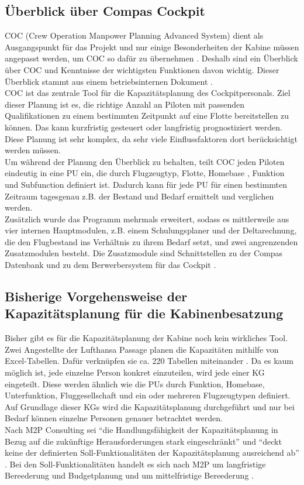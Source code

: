 \documentclass [12pt, a4paper, oneside, titlepage, ngerman]{article}
\begin{document}
\subsection{Überblick über Compas Cockpit}
\ac{COC} (Crew Operation Manpower Planning Advanced System) dient als Ausgangspunkt für das Projekt und nur einige Besonderheiten der Kabine müssen angepasst werden, um \ac{COC} so dafür zu übernehmen \cite[vgl.][]{Gespraech1}. Deshalb sind ein Überblick über \ac{COC} und Kenntnisse der wichtigsten Funktionen davon wichtig. Dieser Überblick stammt aus einem betriebsinternen Dokument \cite[vgl.][]{compasdoku}. \\
\ac{COC} ist das zentrale Tool für die Kapazitätsplanung des Cockpitpersonals. Ziel dieser Planung ist es, die richtige Anzahl an Piloten mit passenden Qualifikationen zu einem bestimmten Zeitpunkt auf eine Flotte bereitstellen zu können. Das kann kurzfristig gesteuert oder langfristig prognostiziert werden. Diese Planung ist sehr komplex, da sehr viele Einflussfaktoren dort berücksichtigt werden müssen. \\
Um während der Planung den Überblick zu behalten, teilt \ac{COC} jeden Piloten eindeutig in eine \ac{PU} ein, die durch Flugzeugtyp, Flotte, Homebase %
, Funktion und Subfunction %
definiert ist. Dadurch kann für jede \ac{PU} für einen bestimmten Zeitraum tagesgenau z.B. der Bestand und Bedarf ermittelt und verglichen werden. \\
Zusätzlich wurde das Programm mehrmals erweitert, sodass es mittlerweile aus vier internen Hauptmodulen, z.B. einem Schulungsplaner und der Deltarechnung, die den Flugbestand ins Verhältnis zu ihrem Bedarf setzt, und zwei angrenzenden Zusatzmodulen besteht. Die Zusatzmodule sind Schnittstellen zu der Compas Datenbank und zu dem Berwerbersystem für das Cockpit \cite[vgl.][S.19]{compasdoku}.


\subsection{Bisherige Vorgehensweise der Kapazitätsplanung für die Kabinenbesatzung} \label{vorgehensweise}
Bisher gibt es für die Kapazitätsplanung der Kabine noch kein wirkliches Tool. Zwei Angestellte der Lufthansa Passage planen die Kapazitäten mithilfe von Excel-Tabellen. Dafür verknüpfen sie ca. 220 Tabellen miteinander \cite[vgl.][]{Gespraech2}. Da es kaum möglich ist, jede einzelne Person konkret einzuteilen, wird jede einer \ac{KG} eingeteilt. Diese werden ähnlich wie die \acp{PU} durch Funktion, Homebase, Unterfunktion, Fluggesellschaft und ein oder mehreren Flugzeugtypen definiert. Auf Grundlage dieser \acp{KG} wird die Kapazitätsplanung durchgeführt und nur bei Bedarf können einzelne Personen genauer betrachtet werden.  \\ %
Nach M2P Consulting sei "`die Handlungsfähigkeit der Kapazitätsplanung in Bezug auf die zukünftige Herausforderungen stark eingeschränkt"' \cite[S.5]{M2P} und "`deckt keine der definierten Soll-Funktionalitäten der Kapazitätsplanung ausreichend ab"' \cite[S.6]{M2P}. Bei den Soll-Funktionalitäten handelt es sich nach M2P um langfristige Bereederung und Budgetplanung und um mittelfristige Bereederung \cite[vgl.][S.6]{M2P}.
\end{document}
